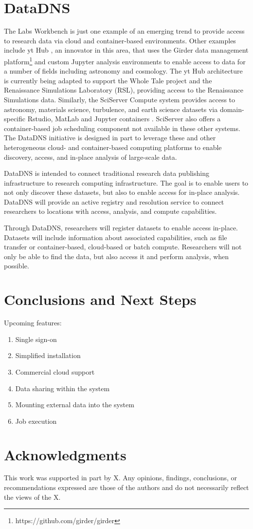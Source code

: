 \documentclass{sig-alternate}
\begin{document}
\section{DataDNS}

The Labs Workbench is just one example of an emerging trend to provide access to research data via cloud and container-based environments.  Other examples include yt Hub \cite{smith2011}, an innovator in this area, that uses the Girder data management platform\footnote{https://github.com/girder/girder} and custom Jupyter analysis environments to enable access to data for a number of fields including astronomy and cosmology. The yt Hub architecture is currently being adapted to support the Whole Tale project and the Renaissance Simulations Laboratory (RSL), providing access to the Renaissance Simulations data\cite{2041-8205-807-1-L12}.  Similarly, the SciServer Compute system provides access to astronomy, materials science, turbulence, and earth science datasets via domain-specific Rstudio, MatLab and Jupyter containers \cite{Medvedev:2016:SCB:2949689.2949700}.  SciServer also offers a container-based job scheduling component not available in these other systems.  The DataDNS initiative is designed in part to leverage these and other heterogeneous cloud- and container-based computing platforms to enable discovery, access, and in-place analysis of large-scale data. 

DataDNS is intended to connect traditional research data publishing infrastructure to research computing infrastructure. The goal is to enable users to not only discover these datasets, but also to enable access for in-place analysis. DataDNS will provide an active registry and resolution service to connect researchers to locations with access, analysis, and compute capabilities.  

Through DataDNS, researchers will register datasets to enable access in-place. Datasets will include information about associated capabilities, such as file transfer or container-based, cloud-based or batch compute. Researchers will not only be able to find the data, but also access it and perform analysis, when possible.   

\section{Conclusions and Next Steps}

Upcoming features:
\begin{enumerate}
\item Single sign-on
\item Simplified installation
\item Commercial cloud support
\item Data sharing within the system
\item Mounting external data into the system
\item Job execution
\end{enumerate}

\section{Acknowledgments}
This work was supported in part by X. Any opinions, findings, conclusions, or recommendations expressed are those of the authors and do not necessarily reflect the views of the X.


  
\end{document}

